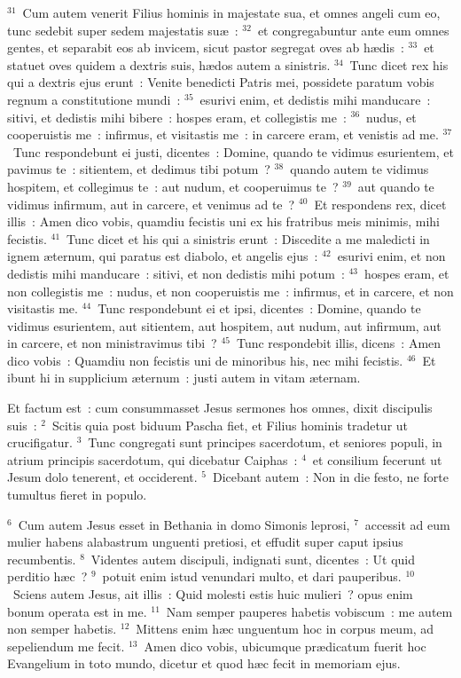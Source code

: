 ${}^{31}$~Cum autem venerit Filius hominis in majestate sua, et omnes angeli cum eo, tunc sedebit super sedem majestatis su\ae~:
${}^{32}$~et congregabuntur ante eum omnes gentes, et separabit eos ab invicem, sicut pastor segregat oves ab h\ae dis~:
${}^{33}$~et statuet oves quidem a dextris suis, h\ae dos autem a sinistris.
${}^{34}$~Tunc dicet rex his qui a dextris ejus erunt~: Venite benedicti Patris mei, possidete paratum vobis regnum a constitutione mundi~:
${}^{35}$~esurivi enim, et dedistis mihi manducare~: sitivi, et dedistis mihi bibere~: hospes eram, et collegistis me~:
${}^{36}$~nudus, et cooperuistis me~: infirmus, et visitastis me~: in carcere eram, et venistis ad me.
${}^{37}$~Tunc respondebunt ei justi, dicentes~: Domine, quando te vidimus esurientem, et pavimus te~: sitientem, et dedimus tibi potum~?
${}^{38}$~quando autem te vidimus hospitem, et collegimus te~: aut nudum, et cooperuimus te~?
${}^{39}$~aut quando te vidimus infirmum, aut in carcere, et venimus ad te~?
${}^{40}$~Et respondens rex, dicet illis~: Amen dico vobis, quamdiu fecistis uni ex his fratribus meis minimis, mihi fecistis.
${}^{41}$~Tunc dicet et his qui a sinistris erunt~: Discedite a me maledicti in ignem \ae ternum, qui paratus est diabolo, et angelis ejus~:
${}^{42}$~esurivi enim, et non dedistis mihi manducare~: sitivi, et non dedistis mihi potum~:
${}^{43}$~hospes eram, et non collegistis me~: nudus, et non cooperuistis me~: infirmus, et in carcere, et non visitastis me.
${}^{44}$~Tunc respondebunt ei et ipsi, dicentes~: Domine, quando te vidimus esurientem, aut sitientem, aut hospitem, aut nudum, aut infirmum, aut in carcere, et non ministravimus tibi~?
${}^{45}$~Tunc respondebit illis, dicens~: Amen dico vobis~: Quamdiu non fecistis uni de minoribus his, nec mihi fecistis.
${}^{46}$~Et ibunt hi in supplicium \ae ternum~: justi autem in vitam \ae ternam.

\lettrine[lines=10,image=true,loversize=0.05,lraise=-0.03]{E}{}t factum est~: cum consummasset Jesus sermones hos omnes, dixit discipulis suis~:
${}^{2}$~Scitis quia post biduum Pascha fiet, et Filius hominis tradetur ut crucifigatur.
${}^{3}$~Tunc congregati sunt principes sacerdotum, et seniores populi, in atrium principis sacerdotum, qui dicebatur Caiphas~:
${}^{4}$~et consilium fecerunt ut Jesum dolo tenerent, et occiderent.
${}^{5}$~Dicebant autem~: Non in die festo, ne forte tumultus fieret in populo.


${}^{6}$~Cum autem Jesus esset in Bethania in domo Simonis leprosi,
${}^{7}$~accessit ad eum mulier habens alabastrum unguenti pretiosi, et effudit super caput ipsius recumbentis.
${}^{8}$~Videntes autem discipuli, indignati sunt, dicentes~: Ut quid perditio h\ae c~?
${}^{9}$~potuit enim istud venundari multo, et dari pauperibus.
${}^{10}$~Sciens autem Jesus, ait illis~: Quid molesti estis huic mulieri~? opus enim bonum operata est in me.
${}^{11}$~Nam semper pauperes habetis vobiscum~: me autem non semper habetis.
${}^{12}$~Mittens enim h\ae c unguentum hoc in corpus meum, ad sepeliendum me fecit.
${}^{13}$~Amen dico vobis, ubicumque pr\ae dicatum fuerit hoc Evangelium in toto mundo, dicetur et quod h\ae c fecit in memoriam ejus.


